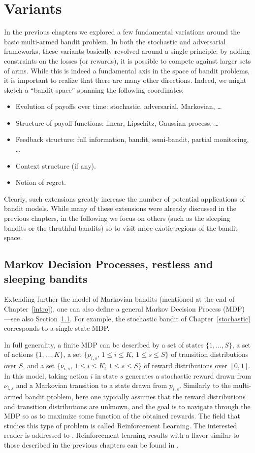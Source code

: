 \documentclass[11pt]{hackednow}
\begin{document}
\chapter{Variants}
\label{variants}
In the previous chapters we explored a few fundamental variations around the basic multi-armed bandit problem. In both the stochastic and adversarial frameworks, these variants basically revolved around a single principle: by adding constraints on the losses (or rewards), it is possible to compete against larger sets of arms. While this is indeed a fundamental axis in the space of bandit problems, it is important to realize that there are many other directions. Indeed, we might sketch a ``bandit space'' spanning the following coordinates:
\begin{itemize}
\item Evolution of payoffs over time: stochastic, adversarial, Markovian, \dots
\item Structure of payoff functions: linear, Lipschitz, Gaussian process, \dots
\item Feedback structure: full information, bandit, semi-bandit, partial monitoring, \dots
\item Context structure (if any).
\item Notion of regret.
\end{itemize}
Clearly, such extensions greatly increase the number of potential applications of bandit models. While many of these extensions were already discussed in the previous chapters, in the following we focus on others (such as the sleeping bandits or the thruthful bandits) so to visit more exotic regions of the bandit space.

\section{Markov Decision Processes, restless and sleeping bandits}
\label{s:mdp}
Extending further the model of Markovian bandits (mentioned at the end of Chapter~\ref{intro}), one can also define a general Markov Decision Process (MDP) ---see also Section~\ref{s:mdp}. For example, the stochastic bandit of Chapter~\ref{stochastic} corresponds to a single-state MDP.

In full generality, a finite MDP can be described by a set of states $\{1, \hdots, S\}$, a set of actions $\{1,\hdots, K\}$, a set $\{p_{i,s},\, 1 \leq i \leq K,\, 1 \leq s \leq S\}$ of transition distributions over $S$, and a set $\{\nu_{i,s},\, 1 \leq i \leq K,\, 1 \leq s \leq S\}$ of reward distributions over $[0,1]$. In this model, taking action $i$ in state $s$ generates a stochastic reward drawn from $\nu_{i,s}$ and a Markovian transition to a state drawn from $p_{i,s}$. Similarly to the multi-armed bandit problem, here one typically assumes that the reward distributions and transition distributions are unknown, and the goal is to navigate through the MDP so as to maximize some function of the obtained rewards. The field that studies this type of problem is called Reinforcement Learning. The interested reader is addressed to \cite{SB98, Kak03, Sze10}. Reinforcement learning results with a flavor similar to those described in the previous chapters can be found in \cite{YMS09, BM10, JOA10, NGSA10}.
\end{document}
